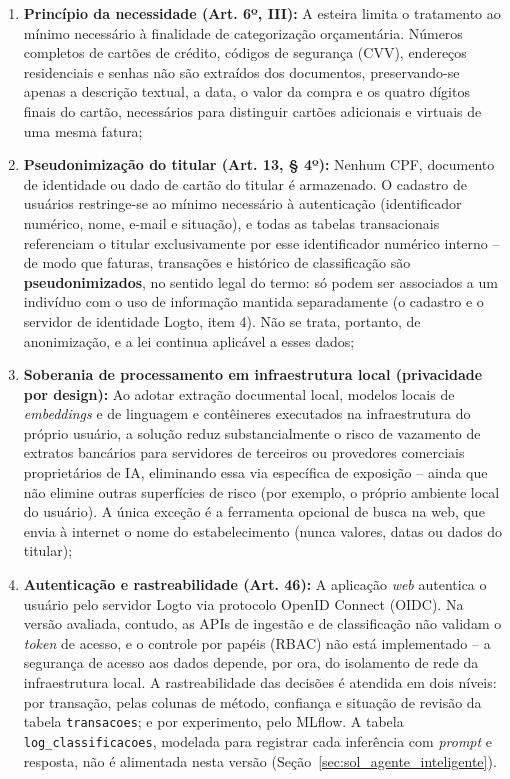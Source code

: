 \begin{enumerate}
	\item \textbf{Princípio da necessidade (Art. 6º, III):} A esteira limita o tratamento ao mínimo necessário à finalidade de categorização orçamentária. Números completos de cartões de crédito, códigos de segurança (CVV), endereços residenciais e senhas não são extraídos dos documentos, preservando-se apenas a descrição textual, a data, o valor da compra e os quatro dígitos finais do cartão, necessários para distinguir cartões adicionais e virtuais de uma mesma fatura;
	\item \textbf{Pseudonimização do titular (Art. 13, § 4º):} Nenhum CPF, documento de identidade ou dado de cartão do titular é armazenado. O cadastro de usuários restringe-se ao mínimo necessário à autenticação (identificador numérico, nome, e-mail e situação), e todas as tabelas transacionais referenciam o titular exclusivamente por esse identificador numérico interno -- de modo que faturas, transações e histórico de classificação são \textbf{pseudonimizados}, no sentido legal do termo: só podem ser associados a um indivíduo com o uso de informação mantida separadamente (o cadastro e o servidor de identidade Logto, item 4). Não se trata, portanto, de anonimização, e a lei continua aplicável a esses dados;
	\item \textbf{Soberania de processamento em infraestrutura local (privacidade por design):} Ao adotar extração documental local, modelos locais de \textit{embeddings} e de linguagem e contêineres executados na infraestrutura do próprio usuário, a solução reduz substancialmente o risco de vazamento de extratos bancários para servidores de terceiros ou provedores comerciais proprietários de IA, eliminando essa via específica de exposição -- ainda que não elimine outras superfícies de risco (por exemplo, o próprio ambiente local do usuário). A única exceção é a ferramenta opcional de busca na web, que envia à internet o nome do estabelecimento (nunca valores, datas ou dados do titular);
	\item \textbf{Autenticação e rastreabilidade (Art. 46):} A aplicação \textit{web} autentica o usuário pelo servidor Logto via protocolo OpenID Connect (OIDC). Na versão avaliada, contudo, as APIs de ingestão e de classificação não validam o \textit{token} de acesso, e o controle por papéis (RBAC) não está implementado -- a segurança de acesso aos dados depende, por ora, do isolamento de rede da infraestrutura local. A rastreabilidade das decisões é atendida em dois níveis: por transação, pelas colunas de método, confiança e situação de revisão da tabela \texttt{transacoes}; e por experimento, pelo MLflow. A tabela \texttt{log\_classificacoes}, modelada para registrar cada inferência com \textit{prompt} e resposta, não é alimentada nesta versão (Seção~\ref{sec:sol_agente_inteligente}).
\end{enumerate}

